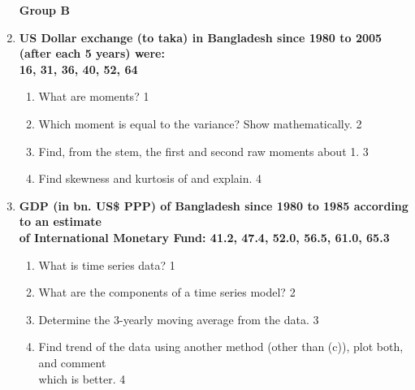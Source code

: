 \documentclass{article}
\begin{document}
\begin{enumerate}
\begin{center}
\textbf{Group B}
\end{center}

 \item
	  \textbf{US Dollar exchange (to taka) in Bangladesh since 1980 to 2005 (after each 5 years) were: \\ 16, 31, 36, 40, 52, 64} 
  
  \begin{enumerate}
    \item
	What are moments? \hfill 1
    \item
	Which moment is equal to the variance? Show mathematically. \hfill 2
    \item  
	Find, from the stem, the first and second raw moments about 1. \hfill 3
    \item
	Find skewness and kurtosis of and explain. \hfill 4
\end{enumerate}

 \item
	  \textbf{GDP (in bn. US\$ PPP) of Bangladesh since 1980 to 1985 according to an estimate \\ of International  Monetary Fund: 41.2, 47.4, 52.0, 56.5, 61.0, 65.3}
  \begin{enumerate}
    \item
	What is time series data? \hfill 1
    \item
	What are the components of a time series model? \hfill 2
    \item  
	Determine the 3-yearly moving average from the data. \hfill 3
    \item
	Find trend of the data using another method (other than (c)), plot both, and comment \\ which is better. \hfill 4
\end{enumerate}

\end{enumerate}
\end{document}
